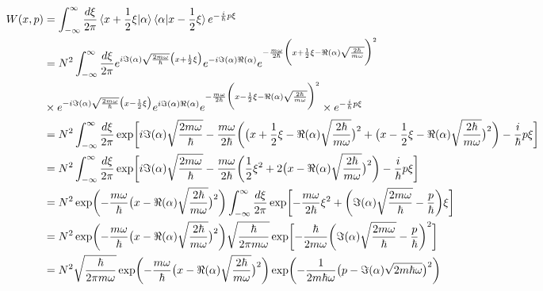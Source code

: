 \documentclass{article}
\begin{document}
        \begin{equation}
            \begin{split}
                W(x, p) &= \int_{-\infty}^\infty\frac{d\xi}{2\pi} \braket{x+\frac{1}{2}\xi|\alpha}\braket{\alpha|x-\frac{1}{2}\xi} e^{-\frac{i}{\hbar}p\xi} \\
                    &= N^2 \int_{-\infty}^\infty\frac{d\xi}{2\pi} e^{i\Im(\alpha)\sqrt{\frac{2m\omega}{\hbar}}\bigl(x+\frac{1}{2}\xi\bigr)} e^{-i\Im(\alpha)\Re(\alpha)} e^{-\frac{m\omega}{2\hbar}\biggl(x+\frac{1}{2}\xi-\Re(\alpha)\sqrt{\frac{2\hbar}{m\omega}}\biggr)^2} \\
                    &\times e^{-i\Im(\alpha)\sqrt{\frac{2m\omega}{\hbar}}\bigl(x-\frac{1}{2}\xi\bigr)} e^{i\Im(\alpha)\Re(\alpha)} e^{-\frac{m\omega}{2\hbar}\biggl(x-\frac{1}{2}\xi-\Re(\alpha)\sqrt{\frac{2\hbar}{m\omega}}\biggr)^2} \times e^{-\frac{i}{\hbar}p\xi} \\
                    &= N^2 \int_{-\infty}^\infty\frac{d\xi}{2\pi} \exp\biggl[i\Im(\alpha)\sqrt{\frac{2m\omega}{\hbar}}  -\frac{m\omega}{2\hbar}\biggl(\bigl(x+\frac{1}{2}\xi-\Re(\alpha)\sqrt{\frac{2\hbar}{m\omega}}\bigr)^2 + \bigl(x-\frac{1}{2}\xi-\Re(\alpha)\sqrt{\frac{2\hbar}{m\omega}}\bigr)^2 \biggr) -\frac{i}{\hbar}p\xi \biggr] \\
                    &= N^2 \int_{-\infty}^\infty\frac{d\xi}{2\pi} \exp\biggl[i\Im(\alpha)\sqrt{\frac{2m\omega}{\hbar}}  -\frac{m\omega}{2\hbar}\biggl(\frac{1}{2}\xi^2 + 2\bigl(x-\Re(\alpha)\sqrt{\frac{2\hbar}{m\omega}}\bigr)^2 \biggr) -\frac{i}{\hbar}p\xi \biggr] \\
                    &= N^2 \exp\biggl(-\frac{m\omega}{\hbar}\bigl(x-\Re(\alpha)\sqrt{\frac{2\hbar}{m\omega}}\bigr)^2\biggr) \int_{-\infty}^\infty\frac{d\xi}{2\pi} \exp\biggl[-\frac{m\omega}{2\hbar}\xi^2+\biggl(\Im(\alpha)\sqrt{\frac{2m\omega}{\hbar}}-\frac{p}{\hbar}\biggr)\xi\biggr] \\
                    &= N^2 \exp\biggl(-\frac{m\omega}{\hbar}\bigl(x-\Re(\alpha)\sqrt{\frac{2\hbar}{m\omega}}\bigr)^2\biggr)  \sqrt{\frac{\hbar}{2\pi m\omega}} \exp\biggl[-\frac{\hbar}{2m\omega}\biggl(\Im(\alpha)\sqrt{\frac{2m\omega}{\hbar}}-\frac{p}{\hbar}\biggr)^2\biggr] \\
                    &= N^2 \sqrt{\frac{\hbar}{2\pi m\omega}} \exp\biggl(-\frac{m\omega}{\hbar}\bigl(x-\Re(\alpha)\sqrt{\frac{2\hbar}{m\omega}}\bigr)^2\biggr) \exp\biggl(-\frac{1}{2m\hbar\omega}\bigl(p-\Im(\alpha)\sqrt{2m\hbar\omega}\bigr)^2\biggr)
            \end{split}
        \end{equation}
\end{document}
